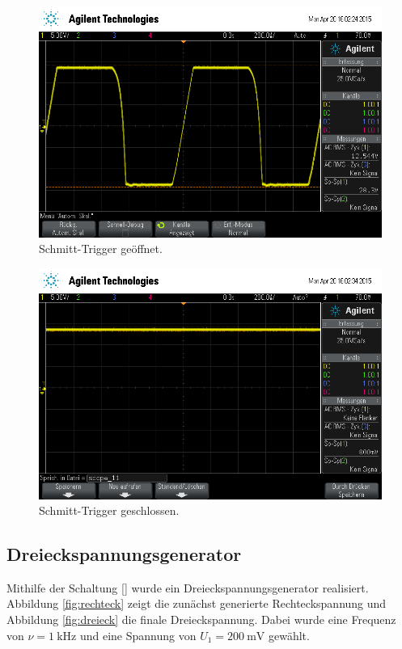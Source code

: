 \begin{figure}[!h]
    \centering
    \includegraphics[width=0.8\linewidth]{data/scope_10.png}
    \caption{Schmitt-Trigger geöffnet.}
    \label{fig:schmitt_offen}
\end{figure}

\begin{figure}[!h]
    \centering
    \includegraphics[width=0.8\linewidth]{data/scope_11.png}
    \caption{Schmitt-Trigger geschlossen.}
    \label{fig:schmitt_geschlossen}
\end{figure}

\subsection{Dreieckspannungsgenerator} %
\label{sub:dreiecksgenerator}

Mithilfe der Schaltung \ref{} wurde ein Dreieckspannungsgenerator realisiert.
Abbildung \ref{fig:rechteck} zeigt die zunächst generierte Rechteckspannung und Abbildung \ref{fig:dreieck} die finale Dreieckspannung.
Dabei wurde eine Frequenz von $\nu = \SI{1}{\kilo\hertz}$ und eine Spannung von $U_1 = \SI{200}{\milli\volt}$ gewählt.

